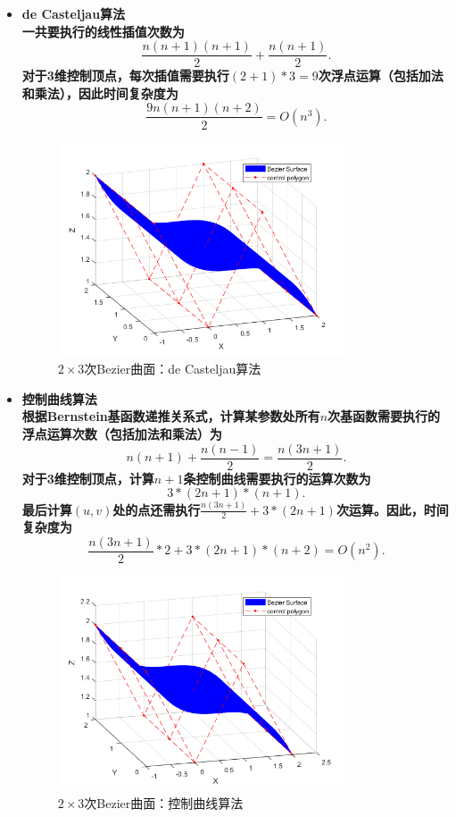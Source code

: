 \documentclass[utf8]{ctexart}
\begin{document}
\begin{itemize}
    \item \bf{de Casteljau算法}\\
    一共要执行的线性插值次数为
    $$
    \frac{n(n+1)(n+1)}{2} + \frac{n(n+1)}{2}.
    $$
    对于3维控制顶点，每次插值需要执行$(2+1)*3=9$次浮点运算（包括加法和乘法），因此时间复杂度为
    $$
    \frac{9n(n+1)(n+2)}{2} = O(n^3).
    $$
    \begin{figure}[H]
        \centering
        \includegraphics[width=0.8\textwidth]{bezierSurf_deCas.png}
        \caption{$2\times 3$次Bezier曲面：de Casteljau算法}
        \label{fig: bezierSurf_deCas}
    \end{figure}
    \item \bf{控制曲线算法}\\
    根据Bernstein基函数递推关系式，计算某参数处所有$n$次基函数需要执行的浮点运算次数（包括加法和乘法）为
    $$
    n(n + 1) + \frac{n(n-1)}{2} = \frac{n(3n+1)}{2}.
    $$
    对于3维控制顶点，计算$n+1$条控制曲线需要执行的运算次数为
    $$
    3 * (2n+1) * (n+1).
    $$
    最后计算$(u,v)$处的点还需执行$\frac{n(3n+1)}{2} + 3 * (2n+1)$次运算。因此，时间复杂度为
    $$
    \frac{n(3n+1)}{2} * 2 + 3 * (2n+1) * (n+2) = O(n^2).
    $$
    \begin{figure}[H]
        \centering
        \includegraphics[width=0.8\textwidth]{bezierSurf_bern.png}
        \caption{$2\times 3$次Bezier曲面：控制曲线算法}
        \label{fig: bezierSurf_bern}
    \end{figure}
\end{itemize}
\end{document}
